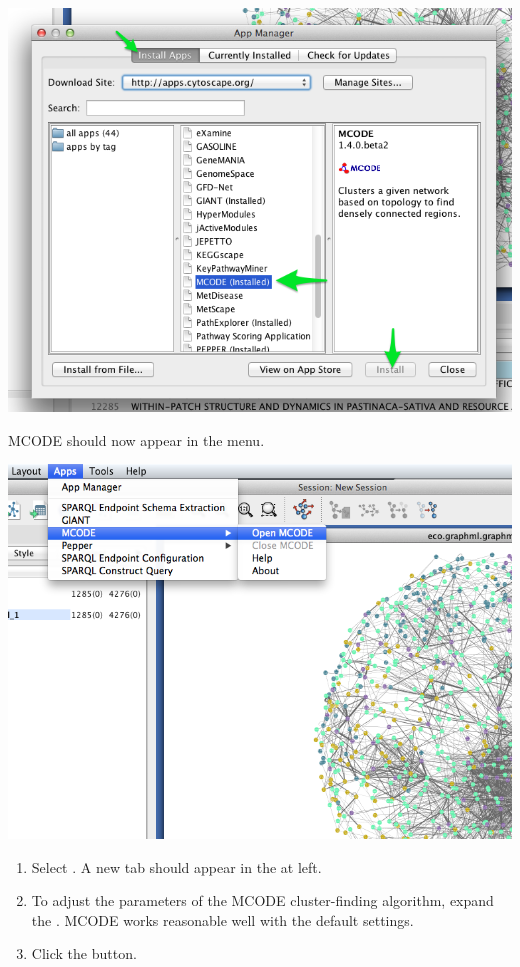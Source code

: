 \documentclass[letterpaper,10pt,english]{sphinxmanual}
\begin{document}
{\hfill\includegraphics{cyto.5.png}\hfill}

MCODE should now appear in the  menu.

{\hfill\includegraphics{cyto.6.png}\hfill}
\begin{enumerate}
\item {} 
Select . A new tab should appear in the 
at left.

\item {} 
To adjust the parameters of the MCODE cluster-finding algorithm, expand the
. MCODE works reasonable well with the default settings.

\item {} 
Click the  button.

\end{enumerate}
\end{document}
